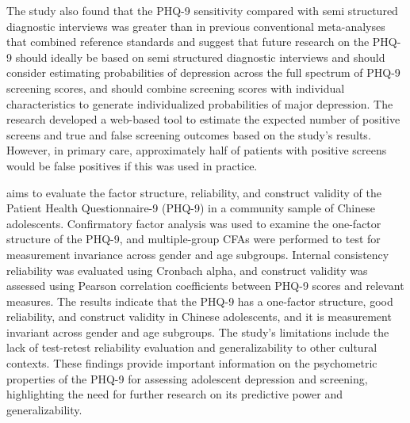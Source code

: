 \documentclass{beamer}
\begin{document}
\begin{frame}
	The study also found that the PHQ-9 sensitivity compared with semi structured diagnostic interviews was greater than in previous conventional meta-analyses that combined reference standards and suggest that future research on the PHQ-9 should ideally be based on semi structured diagnostic interviews and should consider estimating probabilities of depression across the full spectrum of PHQ-9 screening scores, and should combine screening scores with individual characteristics to generate individualized probabilities of major depression. The research developed a web-based tool to estimate the expected number of positive screens and true and false screening outcomes based on the study's results. However, in primary care, approximately half of patients with positive screens would be false positives if this was used in practice.
\end{frame}
\begin{frame}
	\cite{leung2020measurement} aims to evaluate the factor structure, reliability, and construct validity of the Patient Health Questionnaire-9 (PHQ-9) in a community sample of Chinese adolescents. Confirmatory factor analysis was used to examine the one-factor structure of the PHQ-9, and multiple-group CFAs were performed to test for measurement invariance across gender and age subgroups. Internal consistency reliability was evaluated using Cronbach alpha, and construct validity was assessed using Pearson correlation coefficients between PHQ-9 scores and relevant measures. The results indicate that the PHQ-9 has a one-factor structure, good reliability, and construct validity in Chinese adolescents, and it is measurement invariant across gender and age subgroups. The study's limitations include the lack of test-retest reliability evaluation and generalizability to other cultural contexts. These findings provide important information on the psychometric properties of the PHQ-9 for assessing adolescent depression and screening, highlighting the need for further research on its predictive power and generalizability.
\end{frame}
\end{document}
